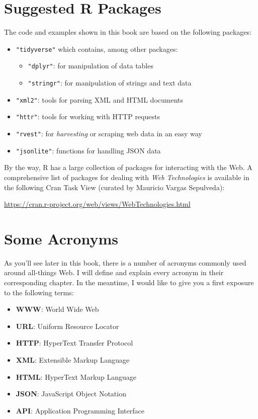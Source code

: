 \documentclass[
]{book}
\providecommand{\tightlist}{%
  \setlength{\itemsep}{0pt}\setlength{\parskip}{0pt}}
\begin{document}
\hypertarget{suggested-r-packages}{%
\section{Suggested R Packages}\label{suggested-r-packages}}

The code and examples shown in this book are based on the following packages:

\begin{itemize}
\item
  \texttt{"tidyverse"} which contains, among other packages:

  \begin{itemize}
  \tightlist
  \item
    \texttt{"dplyr"}: for manipulation of data tables
  \item
    \texttt{"stringr"}: for manipulation of strings and text data
  \end{itemize}
\item
  \texttt{"xml2"}: tools for parsing XML and HTML documents
\item
  \texttt{"httr"}: tools for working with HTTP requests
\item
  \texttt{"rvest"}: for \emph{harvesting} or scraping web data in an easy way
\item
  \texttt{"jsonlite"}: functions for handling JSON data
\end{itemize}

By the way, R has a large collection of packages for interacting with the Web.
A comprehensive list of packages for dealing with \emph{Web Technologies} is
available in the following Cran Task View (curated by Mauricio Vargas Sepulveda):

\url{https://cran.r-project.org/web/views/WebTechnologies.html}

\hypertarget{some-acronyms}{%
\section{Some Acronyms}\label{some-acronyms}}

As you'll see later in this book, there is a number of acronyms commonly used
around all-things Web. I will define and explain every acronym in their
corresponding chapter. In the meantime, I would like to give you a first
exposure to the following terms:

\begin{itemize}
\item
  \textbf{WWW}: World Wide Web
\item
  \textbf{URL}: Uniform Resource Locator
\item
  \textbf{HTTP}: HyperText Transfer Protocol
\item
  \textbf{XML}: Extensible Markup Language
\item
  \textbf{HTML}: HyperText Markup Language
\item
  \textbf{JSON}: JavaScript Object Notation
\item
  \textbf{API}: Application Programming Interface
\end{itemize}
\end{document}
